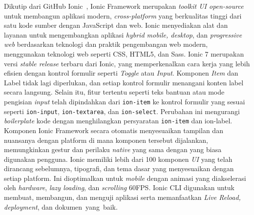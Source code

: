 Dikutip dari GitHub Ionic~\cite{ionic-github}, Ionic Framework merupakan \textit{toolkit UI open-source} untuk membangun aplikasi modern, \textit{cross-platform} yang berkualitas tinggi dari satu kode sumber dengan JavaScript dan web. Ionic menyediakan alat dan layanan untuk mengembangkan aplikasi \textit{hybrid mobile, desktop}, dan \textit{progressive web} berdasarkan teknologi dan praktik pengembangan web modern, menggunakan teknologi web seperti CSS, HTML5, dan Sass. Ionic 7 merupakan versi \textit{stable release} terbaru dari Ionic, yang memperkenalkan cara kerja yang lebih efisien dengan kontrol formulir seperti \textit{Toggle} atau \textit{Input}. Komponen \textit{Item} dan Label tidak lagi diperlukan, dan setiap kontrol formulir menangani konten label secara langsung. Selain itu, fitur tertentu seperti teks bantuan atau mode pengisian \textit{input} telah dipindahkan dari \texttt{ion-item} ke kontrol formulir yang sesuai seperti \texttt{ion-input}, \texttt{ion-textarea}, dan \texttt{ion-select}. Perubahan ini mengurangi \textit{boilerplate} kode dengan menghilangkan persyaratan \texttt{ion-item} dan ion-label. Komponen Ionic Framework secara otomatis menyesuaikan tampilan dan nuansanya dengan platform di mana komponen tersebut dijalankan, memungkinkan gestur dan perilaku \textit{native} yang sama dengan yang biasa digunakan pengguna. Ionic memiliki lebih dari 100 komponen \textit{UI} yang telah dirancang sebelumnya, tipografi, dan tema dasar yang menyesuaikan dengan setiap platform. Ini dioptimalkan untuk \textit{mobile} dengan animasi yang diakselerasi oleh \textit{hardware}, \textit{lazy loading}, dan \textit{scrolling} 60FPS. Ionic CLI digunakan untuk membuat, membangun, dan menguji aplikasi serta memanfaatkan \textit{Live Reload, deployment}, dan dokumen~yang~baik.


